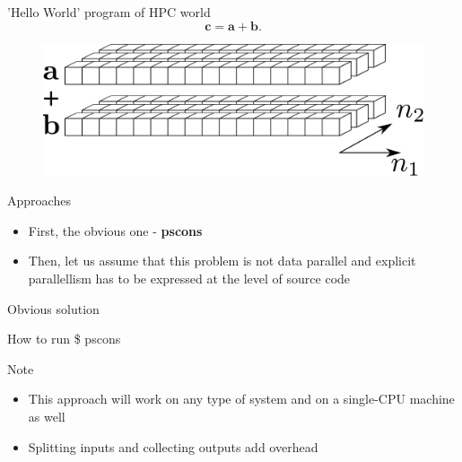 \begin{frame}
  \begin{block}{'Hello World' program of HPC world}
    \[ \mathbf{c} = \mathbf{a} + \mathbf{b}. \]
  \end{block}
  \begin{figure}
  \includegraphics[scale=0.35]{Fig/abcfig.pdf}
  \end{figure}
  \begin{block}{Approaches}
    \begin{itemize}
      \item First, the obvious one - {\bf pscons}
      \item Then, let us assume that this problem is not data parallel and
explicit parallellism has to be expressed at the level of source code
    \end{itemize}
  \end{block}
\end{frame}

\begin{frame}
  \begin{block}{Obvious solution}
  
  \end{block}
  \begin{block}{How to run}
    \$ pscons
  \end{block}
  \begin{block}{Note}
    \begin{itemize}
      \item This approach will work on any type of system and on a
single-CPU machine as well
      \item Splitting inputs and collecting outputs add overhead
    \end{itemize}
  \end{block}
\end{frame}

